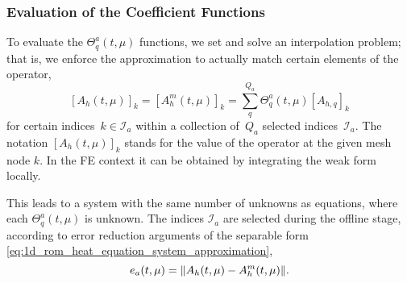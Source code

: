 \documentclass[../1_heat_equation.tex]{subfiles}
\begin{document}
\subsubsection{Evaluation of the Coefficient Functions}
To evaluate the $\Theta_q^a(t, \mu)$ functions, we set and solve an interpolation problem;
that is, 
we enforce the approximation to actually match certain elements of the operator, 
\begin{equation}
    \label{eq:1d_rom_heat_equation_interpolation_problem}
    [A_h(t, \mu)]_{k} = [A_h^m(t, \mu)]_{k} = \sum_q^{Q_a} \Theta_q^a(t, \mu) [A_{h, q}]_{k}
\end{equation}
for certain indices~$k \in \mathcal{I}_a$ within a collection of~$Q_a$ selected indices~$\mathcal{I}_a$.
The notation $[A_h(t, \mu)]_{k}$ stands for the value of the operator at the given mesh node $k$.
In the FE context it can be obtained by integrating the weak form locally.

This leads to a system with the same number of unknowns as equations, where each $\Theta_q^a(t, \mu)$ is unknown.
The indices $\mathcal{I}_a$ are selected during the offline stage, according to error reduction arguments of the separable form \eqref{eq:1d_rom_heat_equation_system_approximation},
\begin{equation}
    e_a(t, \mu) = \norm{A_h(t, \mu) - A_h^m(t, \mu)}.
\end{equation}
\end{document}
